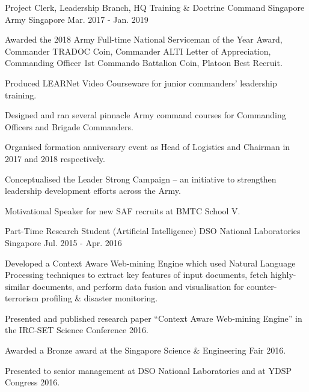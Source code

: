

\begin{cventries}

  \cventry
    {Project Clerk, Leadership Branch, HQ Training \& Doctrine Command} %
    {Singapore Army} %
    {Singapore} %
    {Mar. 2017 - Jan. 2019} %
    {
      \begin{cvitems} %
        \item {Awarded the 2018 Army Full-time National Serviceman of the Year Award, Commander TRADOC Coin, Commander ALTI Letter of Appreciation, Commanding Officer 1st Commando Battalion Coin, Platoon Best Recruit.}
        \item {Produced LEARNet Video Courseware for junior commanders' leadership training.}
        \item {Designed and ran several pinnacle Army command courses for Commanding Officers and Brigade Commanders.}
        \item {Organised formation anniversary event as Head of Logistics and Chairman in 2017 and 2018 respectively.}
        \item {Conceptualised the Leader Strong Campaign – an initiative to strengthen leadership development efforts across the Army.}
        \item {Motivational Speaker for new SAF recruits at BMTC School V.}
      \end{cvitems}
    }

  \cventry
    {Part-Time Research Student (Artificial Intelligence)} %
    {DSO National Laboratories} %
    {Singapore} %
    {Jul. 2015 - Apr. 2016} %
    {
      \begin{cvitems} %
        \item {Developed a Context Aware Web-mining Engine which used Natural Language Processing techniques to extract key features of input documents, fetch highly-similar documents, and perform data fusion and visualisation for counter-terrorism profiling \& disaster monitoring.}
        \item {Presented and published research paper “Context Aware Web-mining Engine” in the IRC-SET Science Conference 2016.}
        \item {Awarded a Bronze award at the Singapore Science \& Engineering Fair 2016.}
        \item {Presented to senior management at DSO National Laboratories and at YDSP Congress 2016.}
      \end{cvitems}
    }


\end{cventries}
